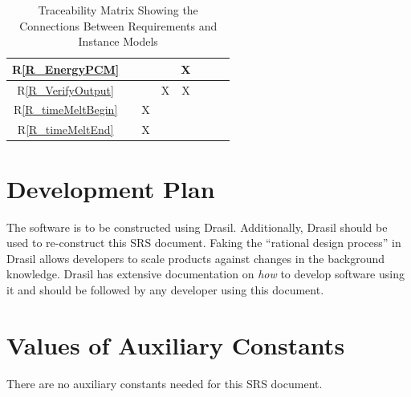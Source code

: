 \documentclass[12pt]{article}
\newcommand{\rref}[1]{R\ref{#1}}
\begin{document}
\begin{table}[h!]
\begin{tabular}{|c|c|c|c|c|c|c|c|}
        \rref{R_EnergyPCM}     &             &             &               & X             &                           &                    &                     \\ \hline
        \rref{R_VerifyOutput}  &             &             & X             & X             &                           &                    &                     \\ \hline
        \rref{R_timeMeltBegin} &             & X           &               &               &                           &                    &                     \\ \hline
        \rref{R_timeMeltEnd}   &             & X           &               &               &                           &                    &                     \\
        \hline
    \end{tabular}
    \caption{Traceability Matrix Showing the Connections Between Requirements and Instance Models}
    \label{Table:R_trace}
\end{table}


\section{Development Plan}
\label{sec_development_plan}

The software is to be constructed using Drasil. Additionally, Drasil should be
used to re-construct this SRS document. Faking the ``rational design process''
in Drasil allows developers to scale products against changes in the background
knowledge. Drasil has extensive documentation on \textit{how} to develop
software using it and should be followed by any developer using this document.


\section{Values of Auxiliary Constants}

There are no auxiliary constants needed for this SRS document.

\newpage


\printbibliography[heading=bibintoc]
\end{document}
